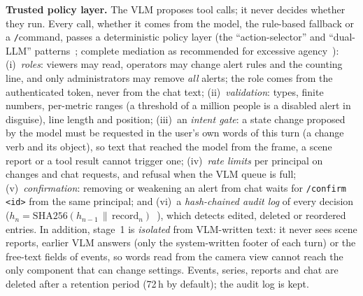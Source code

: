 \textbf{Trusted policy layer.} The VLM proposes tool calls; it never decides whether they run. Every call, whether
it comes from the model, the rule-based fallback or a \texttt{/}command, passes a deterministic policy layer
(the ``action-selector'' and ``dual-LLM'' patterns~\cite{beurerkellner2025patterns}; complete mediation as
recommended for excessive agency~\cite{owasp2025llm}): (i)~\emph{roles}: viewers may read, operators may change
alert rules and the counting line, and only administrators may remove \emph{all} alerts; the role comes from the
authenticated token, never from the chat text; (ii)~\emph{validation}: types, finite numbers, per-metric ranges
(a threshold of a million people is a disabled alert in disguise), line length and position; (iii)~an
\emph{intent gate}: a state change proposed by the model must be requested in the user's own words of this turn
(a change verb and its object), so text that reached the model from the frame, a scene report or a tool result
cannot trigger one; (iv)~\emph{rate limits} per principal on changes and chat requests, and refusal when the VLM
queue is full; (v)~\emph{confirmation}: removing or weakening an alert from chat waits for \texttt{/confirm
<id>} from the same principal; and (vi)~a \emph{hash-chained audit log} of every decision
($h_n = \mathrm{SHA256}(h_{n-1}\,\|\,\text{record}_n)$~\cite{schneier1999audit}), which detects edited, deleted or
reordered entries. In addition, stage~1 is \emph{isolated} from VLM-written text: it never sees scene reports,
earlier VLM answers (only the system-written footer of each turn) or the free-text fields of events, so words read
from the camera view cannot reach the only component that can change settings. Events, series, reports and chat
are deleted after a retention period (72\,h by default); the audit log is kept.
